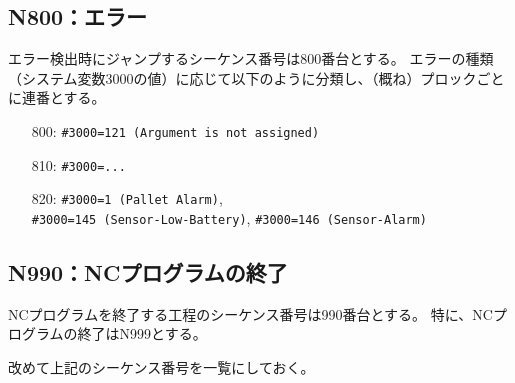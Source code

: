 \subsection{N800：エラー\label{subsec:sequenceNerror}\vphantom{\ref{subsec:sequenceNerror}}\TBW}
エラー検出時にジャンプするシーケンス番号は800番台とする。
エラーの種類（システム変数\ttNum3000の値）に応じて以下のように分類し、（概ね）プロックごとに連番とする。
\begin{enumerate}
\item[800:] \verb|#3000=121 (Argument is not assigned)|
\item[810:] \verb|#3000=...|
\item[820:] \verb|#3000=1 (Pallet Alarm)|,\\
            \verb|#3000=145 (Sensor-Low-Battery)|, \verb|#3000=146 (Sensor-Alarm)|
\end{enumerate}


\subsection{N990：NCプログラムの終了\label{subsec:sequenceNprgEnd}}
NCプログラムを終了する工程のシーケンス番号は990番台とする。
特に、NCプログラムの終了はN999とする。



\clearpage
\noindent
改めて上記のシーケンス番号を一覧にしておく。\\

